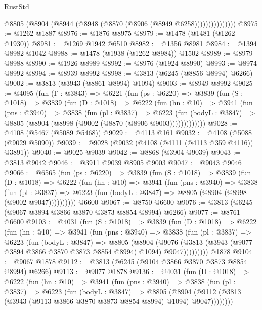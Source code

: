 \begin{lexlean}{RustStd}
\begin{coremodule}
                    @8805 (@8904 (@8944 (@8948 (@8870 (@8906 (@8949 @6258)))))))))))))))
@8975 := @1262 @1887
@8976 := @1876 @8975
@8979 := @1478 (@1481 (@1262 @1930))
@8981 := @1269 @1942 @6510
@8982 := @1356 @8981
@8984 := @1394 @8982 @1042
@8988 := @1478 (@1938 (@1262 @8984)) @1502
@8989 := @8979 @8988
@8990 := @1926 @8989
@8992 := @8976 (@1924 @8990)
@8993 := @8974 @8992
@8994 := @8939 @8992
@8998 := @3813 (@6245 (@8856 @8994) @6266)
@9002 := @3813 (@3943 (@8861 @8994) @1094)
@9003 := @8949 @8992
@9025 := @4095
    (fun (Γ : @3843) =>
    @6221
      (fun (ps : @6220) =>
      @3839
        (fun (S : @1018) =>
        @3839
          (fun (D : @1018) =>
          @6222
            (fun (hn : @10) =>
            @3941
              (fun (pns : @3940) =>
              @3838
                (fun (pl : @3837) =>
                @6223
                  (fun (bodyL : @3847) =>
                  @8805 (@8904 (@8998 (@9002 (@8870 (@8906 @9003)))))))))))))
@9028 := @4108 (@5467 (@5089 @5468))
@9029 := @4113 @161
@9032 := @4108 (@5088 (@9029 @5090))
@9039 := @9028 (@9032 (@4108 (@4111 (@4113 @359 @4116)) @3891))
@9040 := @9025 @9039
@9042 := @8868 (@3904 @9039)
@9043 := @3813 @9042
@9046 := @3911 @9039 @8905 @9003
@9047 := @9043 @9046
@9066 := @6565
    (fun (ps : @6220) =>
    @3839
      (fun (S : @1018) =>
      @3839
        (fun (D : @1018) =>
        @6222
          (fun (hn : @10) =>
          @3941
            (fun (pns : @3940) =>
            @3838
              (fun (pl : @3837) =>
              @6223 (fun (bodyL : @3847) => @8805 (@8904 (@8998 (@9002 @9047))))))))))
    @6600
@9067 := @8750 @6600
@9076 := @3813 (@6245 (@9067 @3894 @3866 @3870 @3873 @8854 @8994) @6266)
@9077 := @8761 @6600
@9103 := @4031
    (fun (S : @1018) =>
    @3839
      (fun (D : @1018) =>
      @6222
        (fun (hn : @10) =>
        @3941
          (fun (pns : @3940) =>
          @3838
            (fun (pl : @3837) =>
            @6223
              (fun (bodyL : @3847) =>
              @8805
                (@8904
                  (@9076
                    (@3813 (@3943 (@9077 @3894 @3866 @3870 @3873 @8854 @8994) @1094) @9047)))))))))
    @1878
@9104 := @9067 @1878
@9112 := @3813 (@6245 (@9104 @3866 @3870 @3873 @8854 @8994) @6266)
@9113 := @9077 @1878
@9136 := @4031
    (fun (D : @1018) =>
    @6222
      (fun (hn : @10) =>
      @3941
        (fun (pns : @3940) =>
        @3838
          (fun (pl : @3837) =>
          @6223
            (fun (bodyL : @3847) =>
            @8805
              (@8904 (@9112 (@3813 (@3943 (@9113 @3866 @3870 @3873 @8854 @8994) @1094) @9047))))))))

\end{coremodule}
\end{lexlean}

